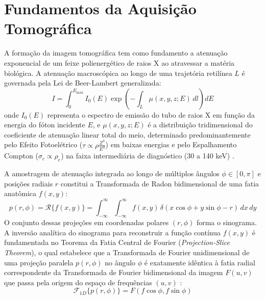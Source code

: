 \documentclass[
  12pt,
  a4paper,
  oneside
]{report}
\begin{document}
\section{Fundamentos da Aquisição Tomográfica}
\label{sec:panorama_fisico_tc}

A formação da imagem tomográfica tem como fundamento a atenuação exponencial de um feixe polienergético de raios X ao atravessar a matéria biológica. A atenuação macroscópica ao longo de uma trajetória retilínea $L$ é governada pela Lei de Beer-Lambert generalizada:
\begin{equation}
  I = \int_0^{E_{\text{máx}}} I_0(E) \exp\left( -\int_L \mu(x, y, z; E) \, dl \right) dE
  \label{eq:beer_lambert}
\end{equation}
onde $I_0(E)$ representa o espectro de emissão do tubo de raios X em função da energia do fóton incidente $E$, e $\mu(x, y, z; E)$ é a distribuição tridimensional do coeficiente de atenuação linear total do meio, determinado predominantemente pelo Efeito Fotoelétrico ($\tau \propto \rho \frac{Z^3}{E^3}$) em baixas energias e pelo Espalhamento Compton ($\sigma_c \propto \rho_e$) na faixa intermediária de diagnóstico (30 a 140 keV) \cite{attix1986, bushberg2020}.

A amostragem de atenuação integrada ao longo de múltiplos ângulos $\phi \in [0, \pi]$ e posições radiais $r$ constitui a Transformada de Radon bidimensional de uma fatia anatômica $f(x, y)$:
\begin{equation}
  p(r, \phi) = \mathcal{R}\{f(x, y)\} = \int_{-\infty}^{\infty} \int_{-\infty}^{\infty} f(x, y) \, \delta(x\cos\phi + y\sin\phi - r) \, dx \, dy
  \label{eq:radon_transform}
\end{equation}
O conjunto dessas projeções em coordenadas polares $(r, \phi)$ forma o sinograma. A inversão analítica do sinograma para reconstruir a função contínua $f(x, y)$ é fundamentada no Teorema da Fatia Central de Fourier (\emph{Projection-Slice Theorem}), o qual estabelece que a Transformada de Fourier unidimensional de uma projeção paralela $p(r, \phi)$ no ângulo $\phi$ é exatamente idêntica à fatia radial correspondente da Transformada de Fourier bidimensional da imagem $F(u, v)$ que passa pela origem do espaço de frequências $(u, v)$ \cite{barrett_myers_2004, seeram2015}:
\begin{equation}
  \mathcal{F}_{1D}\{p(r, \phi)\} = F(f\cos\phi, f\sin\phi)
  \label{eq:fourier_slice}
\end{equation}
\end{document}
